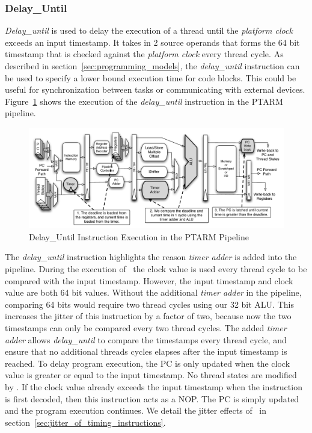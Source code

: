\subsubsection{Delay\_Until}    
\emph{Delay\_until} is used to delay the execution of a thread until the \emph{platform clock} exceeds an input timestamp.
It takes in 2 source operands that forms the 64 bit timestamp that is checked against the \emph{platform clock} every thread cycle.
As described in section~\ref{sec:programming_models}, the \emph{delay\_until} instruction can be used to specify a lower bound execution time for code blocks.
This could be useful for synchronization between tasks or communicating with external devices.
Figure~\ref{fig:delay_until_pipeline_implementation} shows the execution of the \emph{delay\_until} instruction in the PTARM pipeline.       
\begin{figure}[h]
  \vspace{-15pt}
  \begin{center}
    \includegraphics[scale=.54]{figs/delay_until_pipeline_implementation}
  \end{center}
  \vspace{-3mm}
  \caption{Delay\_Until Instruction Execution in the PTARM Pipeline}
  \label{fig:delay_until_pipeline_implementation}
\end{figure}

The \emph{delay\_until} instruction highlights the reason \emph{timer adder} is added into the pipeline.
During the execution of \delayuntil\, the clock value is used every thread cycle to be compared with the input timestamp.
However, the input timestamp and clock value are both 64 bit values.
Without the additional \emph{timer adder} in the pipeline, comparing 64 bits would require two thread cycles using our 32 bit ALU. 
This increases the jitter of this instruction by a factor of two, because now the two timestamps can only be compared every two thread cycles. 
The added \emph{timer adder} allows \emph{delay\_until} to compare the timestamps every thread cycle, and ensure that no additional threads cycles elapses after the input timestamp is reached. 
To delay program execution, the PC is only updated when the clock value is greater or equal to the input timestamp.
No thread states are modified by \delayuntil.
If the clock value already exceeds the input timestamp when the instruction is first decoded, then this instruction acts as a NOP. 
The PC is simply updated and the program execution continues.
We detail the jitter effects of \delayuntil\ in section~\ref{sec:jitter_of_timing_instructions}.

